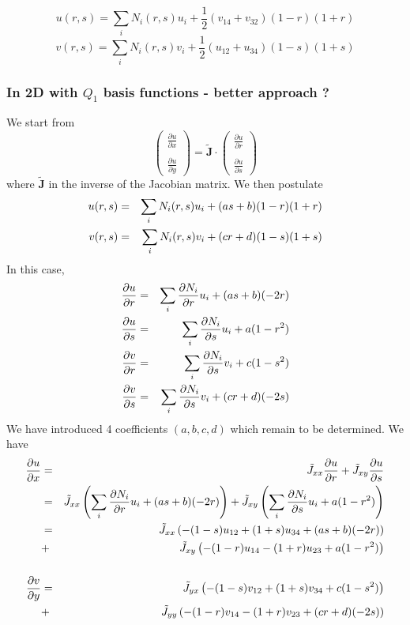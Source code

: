 \[
\boxed{
u(r,s)=\sum_i N_i(r,s) u_i + \frac{1}{2}(v_{14} + v_{32})(1-r)(1+r) 
}
\]
\[
\boxed{
v(r,s)
=\sum_i N_i(r,s) v_i + \frac{1}{2} (u_{12} + u_{34})(1-s)(1+s) 
}
\]

\subsubsection{In 2D with $Q_1$ basis functions - better approach ?}


We start from
\[
\left(
\begin{array}{c}
\frac{\partial u}{\partial x} \\ \\
\frac{\partial u}{\partial y} 
\end{array}
\right)
=
\tilde{\bm J} \cdot
\left(
\begin{array}{c}
\frac{\partial u}{\partial r} \\ \\
\frac{\partial u}{\partial s} 
\end{array}
\right)
\]
where $\tilde{\bm J}$ in the inverse of the Jacobian matrix.
We then postulate
\begin{eqnarray}
u(r,s)&=&\sum_i N_i(r,s) u_i + (a s + b)(1-r)(1+r) \nonumber\\
v(r,s)&=&\sum_i N_i(r,s) v_i + (c r + d)(1-s)(1+s) \nonumber
\end{eqnarray}
In this case,
\begin{eqnarray}
\frac{\partial u}{\partial r}&=&\sum_i \frac{\partial N_i}{\partial r} u_i + (a s + b) (-2r)   \nonumber\\
\frac{\partial u}{\partial s}&=&\sum_i \frac{\partial N_i}{\partial s} u_i + a (1-r^2) \nonumber\\
\frac{\partial v}{\partial r}&=&\sum_i \frac{\partial N_i}{\partial s} v_i + c (1-s^2) \nonumber\\
\frac{\partial v}{\partial s}&=&\sum_i \frac{\partial N_i}{\partial s} v_i + (c r + d)(-2s) \nonumber
\end{eqnarray}
We have introduced 4 coefficients  $(a,b,c,d)$ which remain to be determined.
We have
\begin{eqnarray}
\frac{\partial u}{\partial x} 
&=& \tilde{J}_{xx} \frac{\partial u}{\partial r} +  \tilde{J}_{xy} \frac{\partial u}{\partial s}  \nonumber\\
&=& \tilde{J}_{xx} \left( \sum_i \frac{\partial N_i}{\partial r} u_i + (a s + b) (-2r)  \right) 
 +  \tilde{J}_{xy} \left( \sum_i \frac{\partial N_i}{\partial s} u_i + a (1-r^2) \right)  \nonumber\\
&=& \tilde{J}_{xx} \left(  -(1-s) u_{12} + (1+s) u_{34} + (a s + b) (-2r)  \right) \nonumber\\ 
&+&  \tilde{J}_{xy} \left(  -(1-r) u_{14} - (1+r) u_{23} + a (1-r^2) \right) \nonumber\\ 
\nonumber\\
\frac{\partial v}{\partial y} 
&=& \tilde{J}_{yx} \left(  -(1-s) v_{12} + (1+s) v_{34} + c (1-s^2)   \right)  \nonumber\\
&+&  \tilde{J}_{yy} \left(  -(1-r) v_{14} - (1+r) v_{23} + (cr+d) (-2s) \right) \nonumber
\end{eqnarray}
